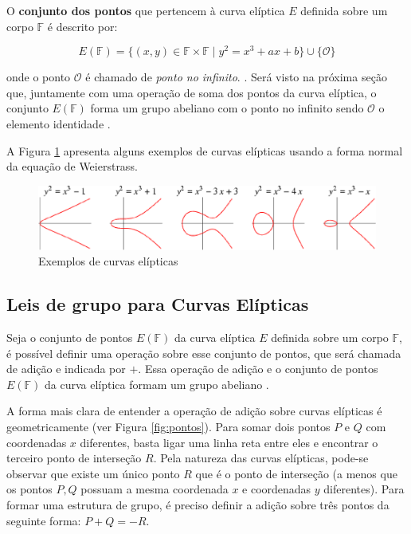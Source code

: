 O \textbf{conjunto dos pontos} que pertencem à curva elíptica \(E\) definida sobre um corpo \(\mathbb{F}\) é descrito por:

\begin{equation}
E(\mathbb{F}) = \{(x,y) \in \mathbb{F} \times \mathbb{F} \mid y^2 = x^3 + ax + b\} \cup \{\mathcal{O}\}
\label{eq:pontosCurva}
\end{equation}

onde o ponto $\mathcal{O}$ é chamado de \textit{ponto no infinito}. \cite{Mandy:2007}. Será visto na próxima seção que, juntamente com uma operação de soma dos pontos da curva elíptica, o conjunto $E(\mathbb{F})$ forma um grupo abeliano com o ponto no infinito sendo $\mathcal{O}$ o elemento identidade \cite{Guide}.

A Figura \ref{fig:curvas} apresenta alguns exemplos de curvas elípticas usando a forma normal da equação de Weierstrass.

\begin{figure}[h]
\centering
\includegraphics[scale=0.5, bb=0 0 529 101]{figuras/curvas.eps}
\caption{Exemplos de curvas elípticas}
\label{fig:curvas}
\end{figure}

%
%
\subsection{Leis de grupo para Curvas Elípticas}
Seja o conjunto de pontos $E(\mathbb{F})$ da curva elíptica \(E\) definida sobre um corpo \(\mathbb{F}\), é possível definir uma operação sobre esse conjunto de pontos, que será chamada de adição e indicada por $+$. Essa operação de adição e o conjunto de pontos $E(\mathbb{F})$ da curva elíptica formam um grupo abeliano \cite{Stallings:2011}.

A forma mais clara de entender a operação de adição sobre curvas elípticas é geometricamente (ver Figura \ref{fig:pontos}). Para somar dois pontos \(P\) e \(Q\) com coordenadas \(x\) diferentes, basta ligar uma linha reta entre eles e encontrar o terceiro ponto de interseção \(R\). Pela natureza das curvas elípticas, pode-se observar que existe um único ponto \(R\) que é o ponto de interseção (a menos que os pontos \(P, Q\) possuam a mesma coordenada $x$ e coordenadas $y$ diferentes). Para formar uma estrutura de grupo, é preciso  definir a adição sobre três pontos da seguinte forma: $P+Q=-R$. \cite{Stallings:2011}

